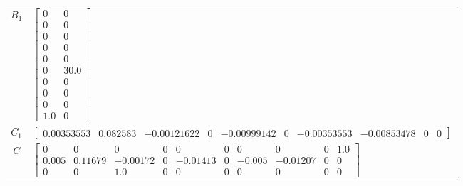 \begin{tabular}{cl}
 $B_{1}$  & $\left[\begin{matrix}0 & 0\\0 & 0\\0 & 0\\0 & 0\\0 & 0\\0 & 30.0\\0 & 0\\0 & 0\\0 & 0\\1.0 & 0\end{matrix}\right]$                                                                                                                                                                                                                                                                                                                                                                                                                                                                                                          \\
 $C_{1}$  & $\left[\begin{matrix}0.00353553 & 0.082583 & -0.00121622 & 0 & -0.00999142 & 0 & -0.00353553 & -0.00853478 & 0 & 0\end{matrix}\right]$                                                                                                                                                                                                                                                                                                                                                                                                                                                                                      \\
   $C$    & $\left[\begin{matrix}0 & 0 & 0 & 0 & 0 & 0 & 0 & 0 & 0 & 1.0\\0.005 & 0.11679 & -0.00172 & 0 & -0.01413 & 0 & -0.005 & -0.01207 & 0 & 0\\0 & 0 & 1.0 & 0 & 0 & 0 & 0 & 0 & 0 & 0\end{matrix}\right]$                                                                                                                                                                                                                                                                                                                                                                                                                        \\

\end{tabular}
